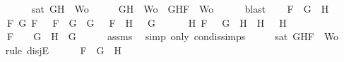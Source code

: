 \begin{isabellebody}
\ \ \ \ \ \ \ \ \ {\isachardoublequoteopen}sat\ {\isacharparenleft}{\isacharbraceleft}G{\isacharcomma}H{\isacharbraceright}\ {\isasymunion}\ Wo{\isacharparenright}{\isachardoublequoteclose}\isanewline
%
\isadelimproof
%
\endisadelimproof
%
\isatagproof
{}\isamarkupfalse%
\ {\isacharminus}\isanewline
\ \ \isamarkupfalse%
\ {\isachardoublequoteopen}{\isacharbraceleft}G{\isacharcomma}H{\isacharbraceright}\ {\isasymunion}\ Wo\ {\isasymsubseteq}\ {\isacharbraceleft}G{\isacharcomma}H{\isacharcomma}F{\isacharbraceright}\ {\isasymunion}\ Wo{\isachardoublequoteclose}\isanewline
\ \ \ \ \isamarkupfalse%
\ blast\isanewline
\ \ \isamarkupfalse%
\ {\isachardoublequoteopen}F\ {\isacharequal}\ G\ \isactrlbold {\isasymand}\ H\ {\isasymor}\ \isanewline
\ \ \ \ {\isacharparenleft}{\isasymexists}F{}\ G{}{\isachardot}\ F\ {\isacharequal}\ \isactrlbold {\isasymnot}\ {\isacharparenleft}F{}\ \isactrlbold {\isasymor}\ G{}{\isacharparenright}\ {\isasymand}\ G\ {\isacharequal}\ \isactrlbold {\isasymnot}\ F{}\ {\isasymand}\ H\ {\isacharequal}\ \isactrlbold {\isasymnot}\ G{}{\isacharparenright}\ {\isasymor}\ \isanewline
\ \ \ \ {\isacharparenleft}{\isasymexists}H{}{\isachardot}\ F\ {\isacharequal}\ \isactrlbold {\isasymnot}\ {\isacharparenleft}G\ \isactrlbold {\isasymrightarrow}\ H{}{\isacharparenright}\ {\isasymand}\ H\ {\isacharequal}\ \isactrlbold {\isasymnot}\ H{}{\isacharparenright}\ {\isasymor}\ \isanewline
\ \ \ \ F\ {\isacharequal}\ \isactrlbold {\isasymnot}\ {\isacharparenleft}\isactrlbold {\isasymnot}\ G{\isacharparenright}\ {\isasymand}\ H\ {\isacharequal}\ G{\isachardoublequoteclose}\isanewline
\ \ \ \ \isamarkupfalse%
\ assms{\isacharparenleft}{}{\isacharparenright}\ \isamarkupfalse%
\ {\isacharparenleft}simp\ only{\isacharcolon}\ con{\isacharunderscore}dis{\isacharunderscore}simps{\isacharparenleft}{}{\isacharparenright}{\isacharparenright}\isanewline
\ \ \isamarkupfalse%
\ \isamarkupfalse%
\ {\isachardoublequoteopen}sat\ {\isacharparenleft}{\isacharbraceleft}G{\isacharcomma}H{\isacharcomma}F{\isacharbraceright}\ {\isasymunion}\ Wo{\isacharparenright}{\isachardoublequoteclose}\isanewline
\ \ \isamarkupfalse%
\ {\isacharparenleft}rule\ disjE{\isacharparenright}\isanewline
\ \ \ \ \isamarkupfalse%
\ {\isachardoublequoteopen}F\ {\isacharequal}\ G\ \isactrlbold {\isasymand}\ H{\isachardoublequoteclose}\isanewline

\end{isabellebody}
